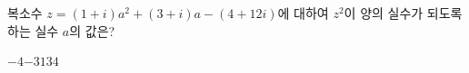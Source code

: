 복소수 $z=(1+i)a^2+(3+i)a-(4+12i)$에 대하여 $z^2$이 양의 실수가 되도록 하는 실수 $a$의 값은?
\begin{choices32}{$-4$}{$-3$}{$1$}{$3$}{$4$}\end{choices32}
